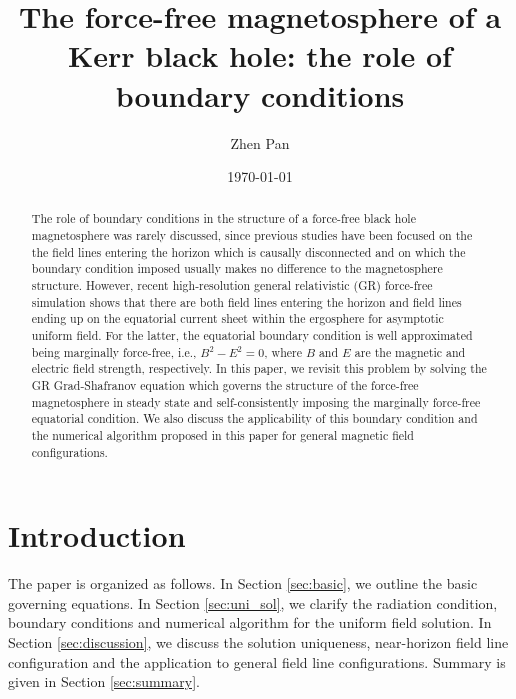 \documentclass[aps,prd,reprint,nofootinbib, superscriptaddress]{revtex4-1}
\begin{document}
\title{The force-free magnetosphere of a Kerr black hole: the role of boundary conditions}
\author{Zhen Pan}

\date{\today}

\begin{abstract}
    The role of boundary conditions in the structure of
    a force-free black hole magnetosphere was rarely discussed, since previous studies have been focused on the
    the field lines entering the horizon which is causally disconnected and on which the boundary
    condition imposed usually makes no difference to the magnetosphere structure. However,
    recent high-resolution general relativistic (GR) force-free simulation shows that there are both
    field lines entering the horizon and field lines ending up on the equatorial current sheet
    within the ergosphere for asymptotic uniform field. For the latter, the equatorial boundary
    condition is well approximated being marginally force-free, i.e., $B^2-E^2=0$, where $B$ and
    $E$ are the magnetic and electric field strength, respectively. In this paper, we revisit this
    problem by solving the GR Grad-Shafranov equation which governs the structure of
    the force-free magnetosphere in steady state and self-consistently imposing the marginally force-free equatorial
    condition. We also discuss the applicability of this boundary condition and the numerical algorithm proposed
    in this paper for general magnetic field configurations.
\end{abstract}


\maketitle

\section{Introduction}

The paper is organized as follows.  In Section \ref{sec:basic}, we outline the basic governing equations.
In Section \ref{sec:uni_sol}, we clarify the radiation condition, boundary conditions and numerical algorithm
for the uniform field solution. In Section \ref{sec:discussion}, we discuss the solution uniqueness, near-horizon
field line configuration and the application to general field line configurations. Summary is given in Section \ref{sec:summary}.
\end{document}
